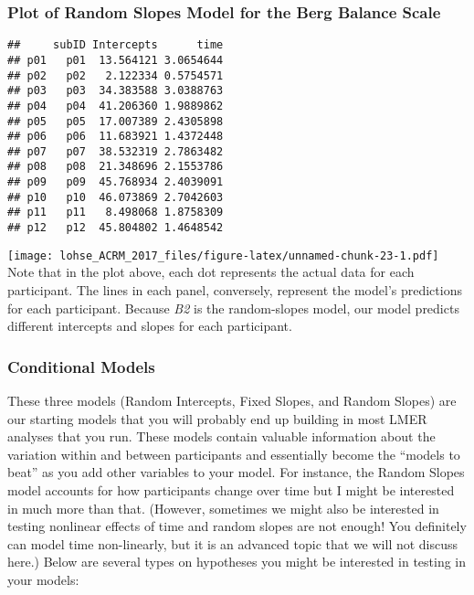 \documentclass[]{article}
\begin{document}
\newpage

\subsubsection{Plot of Random Slopes Model for the Berg Balance
Scale}\label{plot-of-random-slopes-model-for-the-berg-balance-scale}

\begin{verbatim}
##     subID Intercepts      time
## p01   p01  13.564121 3.0654644
## p02   p02   2.122334 0.5754571
## p03   p03  34.383588 3.0388763
## p04   p04  41.206360 1.9889862
## p05   p05  17.007389 2.4305898
## p06   p06  11.683921 1.4372448
## p07   p07  38.532319 2.7863482
## p08   p08  21.348696 2.1553786
## p09   p09  45.768934 2.4039091
## p10   p10  46.073869 2.7042603
## p11   p11   8.498068 1.8758309
## p12   p12  45.804802 1.4648542
\end{verbatim}

\texttt{[image: lohse\_ACRM\_2017\_files/figure-latex/unnamed-chunk-23-1.pdf]}
Note that in the plot above, each dot represents the actual data for
each participant. The lines in each panel, conversely, represent the
model's predictions for each participant. Because \emph{B2} is the
random-slopes model, our model predicts different intercepts and slopes
for each participant.

\newpage

\subsubsection{Conditional Models}\label{conditional-models}

These three models (Random Intercepts, Fixed Slopes, and Random Slopes)
are our starting models that you will probably end up building in most
LMER analyses that you run. These models contain valuable information
about the variation within and between participants and essentially
become the ``models to beat'' as you add other variables to your model.
For instance, the Random Slopes model accounts for how participants
change over time but I might be interested in much more than that.
(However, sometimes we might also be interested in testing nonlinear
effects of time and random slopes are not enough! You definitely can
model time non-linearly, but it is an advanced topic that we will not
discuss here.) Below are several types on hypotheses you might be
interested in testing in your models:
\end{document}
